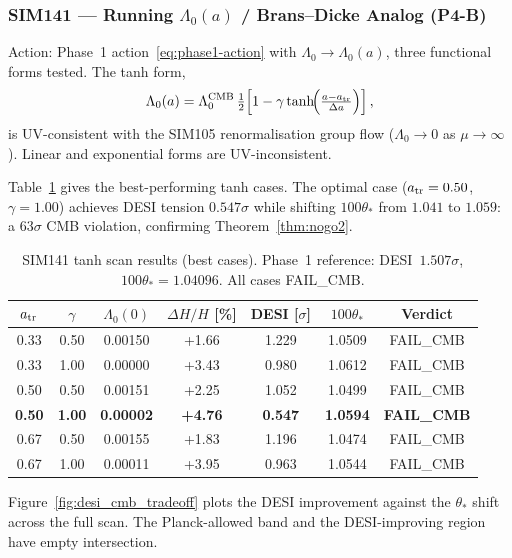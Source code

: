 \documentclass[12pt,a4paper]{article}
\newcommand{\Lz}{\Lambda_0}
\newcommand{\thetastar}{\theta_*}
\theoremstyle{plain}
\begin{document}
\subsubsection{SIM141 --- Running $\Lz(a)$ / Brans--Dicke Analog (P4-B)}

Action: Phase~1 action~\eqref{eq:phase1-action} with $\Lz\to\Lz(a)$, three
functional forms tested. The tanh form,
\begin{equation}
  \Lz(a) = \Lz^{\rm CMB}\,
  \tfrac{1}{2}\Bigl[1
    -\gamma\tanh\!\Bigl(\tfrac{a-a_{\rm tr}}{\Delta a}\Bigr)\Bigr]\,,
  \label{eq:lz-tanh}
\end{equation}
is UV-consistent with the SIM105 renormalisation group flow
($\Lz\to0$ as $\mu\to\infty$). Linear and exponential forms are UV-inconsistent.

Table~\ref{tab:sim141} gives the best-performing tanh cases. The optimal case
($a_{\rm tr}=0.50$, $\gamma=1.00$) achieves DESI tension $0.547\sigma$ while
shifting $100\thetastar$ from $1.041$ to $1.059$: a $63\sigma$ CMB violation,
confirming Theorem~\ref{thm:nogo2}.

\begin{table}[h!]
\centering
\caption{SIM141 tanh scan results (best cases). Phase~1 reference: DESI~$1.507\sigma$,
$100\thetastar=1.04096$. All cases FAIL\_CMB.}
\label{tab:sim141}
\setlength{\tabcolsep}{5pt}
\begin{tabular}{ccccccc}
\toprule
$a_{\rm tr}$ & $\gamma$ & $\Lz(0)$ & $\Delta H/H$ [\%] & DESI [$\sigma$] & $100\thetastar$ & Verdict \\
\midrule
0.33 & 0.50 & 0.00150 & +1.66 & 1.229 & 1.0509 & FAIL\_CMB \\
0.33 & 1.00 & 0.00000 & +3.43 & 0.980 & 1.0612 & FAIL\_CMB \\
0.50 & 0.50 & 0.00151 & +2.25 & 1.052 & 1.0499 & FAIL\_CMB \\
\textbf{0.50} & \textbf{1.00} & \textbf{0.00002} & \textbf{+4.76} & \textbf{0.547} & \textbf{1.0594} & \textbf{FAIL\_CMB} \\
0.67 & 0.50 & 0.00155 & +1.83 & 1.196 & 1.0474 & FAIL\_CMB \\
0.67 & 1.00 & 0.00011 & +3.95 & 0.963 & 1.0544 & FAIL\_CMB \\
\bottomrule
\end{tabular}
\end{table}

Figure~\ref{fig:desi_cmb_tradeoff} plots the DESI improvement against the
$\thetastar$ shift across the full scan. The Planck-allowed band and the
DESI-improving region have empty intersection.
\end{document}
